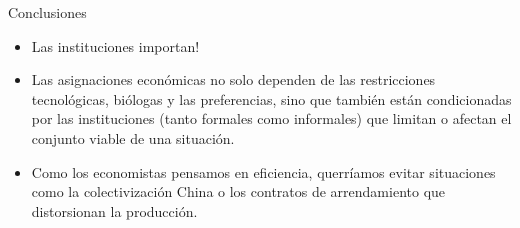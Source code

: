 \documentclass{beamer}
\begin{document}
\begin{frame}{Conclusiones}
    \begin{itemize}
        \item Las instituciones importan!
        \item Las asignaciones económicas no solo dependen de las restricciones tecnológicas, biólogas y las preferencias, sino que también están condicionadas por las instituciones (tanto formales como informales) que limitan o afectan el conjunto viable de una situación.
        \item Como los economistas pensamos en eficiencia,  querríamos evitar situaciones como la colectivización China o los contratos de arrendamiento que distorsionan la producción.
    \end{itemize}
\end{frame}
\end{document}
